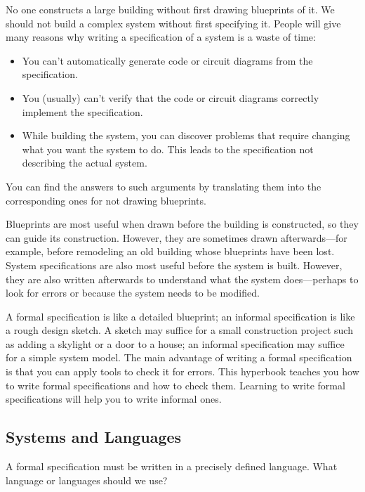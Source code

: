 \documentclass[fleqn,leqno]{article}
\begin{document}
No one constructs a large building without first drawing blueprints of
it.  We should not build a complex system without first specifying it.
People will give many reasons why writing a specification of a
system is a waste of time:
\begin{itemize}
\item You can't automatically generate code or circuit diagrams from
the specification.

\item You (usually) can't verify that the code or circuit diagrams
correctly implement the specification.

\item While building the system, you can discover problems that
require changing what you want the system to do.  This leads to the
specification not describing the actual system.
\end{itemize}
You can find the answers to such arguments by translating them into
the corresponding ones for not drawing blueprints.

Blueprints are most useful when drawn before the building is
constructed, so they can guide its construction.  However, they are
sometimes drawn afterwards---for example, before remodeling an old
building whose blueprints have been lost.  System specifications are
also most useful before the system is built.  However, they are also
written afterwards to understand what the system does---perhaps to
look for errors or because the system needs to be modified.

A formal specification is like a detailed blueprint; an informal
specification is like a rough design sketch.  A sketch may suffice for
a small construction project such as adding a skylight or a door to a
house; an informal specification may suffice for a simple system model.
The main advantage of writing a formal specification is that you can
apply tools to check it for errors.  This hyperbook teaches you how to
write formal specifications and how to check them.  Learning to write
formal specifications will help you to write informal ones.


\subsection{Systems and Languages}

A formal specification must be written in a precisely defined
language.  What language or languages should we use?
\end{document}
